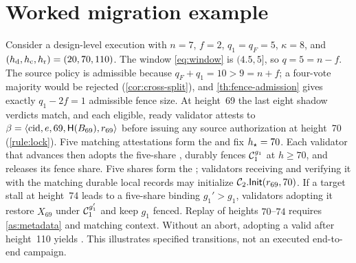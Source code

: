 \section{Worked migration example}
\label{app:example}
Consider a design-level execution with $n=7$, $f=2$, $q_1=q_F=5$, $\kappa=8$, and
$(h_{\mathrm d},h_{\mathrm c},h_{\mathrm r})=(20,70,110)$. The window \eqref{eq:window} is $(4.5,5]$, so $q=5=n-f$.
The source policy is admissible because $q_F+q_1=10>9=n+f$; a four-vote majority would be
rejected (\cref{cor:cross-split}), and \cref{th:fence-admission} gives exactly $q_1-2f=1$
admissible fence size. At height~69 the last eight shadow verdicts match, and each eligible,
ready validator attests to $\beta=\langle\mathrm{cid},e,69,\mathsf{H}(B_{69}),r_{69}\rangle$ before
issuing any source authorization at height~70 (\cref{rule:lock}). Five matching attestations form
the \CutCert{} and fix $h_{\star}=70$. Each validator that advances then adopts the five-share \ManCert,
durably fences $\mathcal{C}_1^{g_1}$ at $h\ge70$, and releases its fence share. Five shares form the
\FenceCert; validators receiving and verifying it with the matching durable local records may
initialize $\mathcal{C}_2.\mathsf{Init}(r_{69},70)$. If a target stall at height~74 leads to a five-share
\AbortCert{} binding $g_1'>g_1$, validators adopting it restore $X_{69}$ under
$\mathcal{C}_1^{g_1'}$ and keep $g_1$ fenced. Replay of heights $70$--$74$ requires \cref{as:metadata}
and matching context. Without an abort, adopting a valid \SealCert{} after height~110 yields
. This illustrates specified transitions, not an executed end-to-end campaign.
